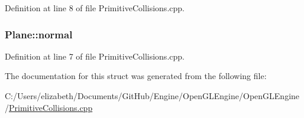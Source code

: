 Definition at line 8 of file Primitive\+Collisions.\+cpp.

\subsubsection[{\texorpdfstring{normal}{normal}}]{ Plane\+::normal}\hypertarget{struct_plane_ac3a6d80b28df1dd0ef7867663227c937}{}\label{struct_plane_ac3a6d80b28df1dd0ef7867663227c937}


Definition at line 7 of file Primitive\+Collisions.\+cpp.



The documentation for this struct was generated from the following file\+:\begin{DoxyCompactItemize}
\item 
C\+:/\+Users/elizabeth/\+Documents/\+Git\+Hub/\+Engine/\+Open\+G\+L\+Engine/\+Open\+G\+L\+Engine/\hyperlink{_primitive_collisions_8cpp}{Primitive\+Collisions.\+cpp}\end{DoxyCompactItemize}
